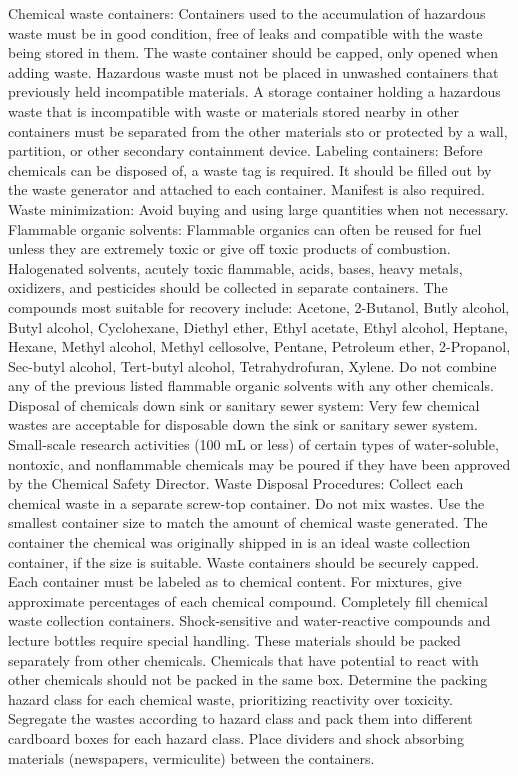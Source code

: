 \documentclass[12pt]{../SOP2}
\begin{document}
Chemical waste containers:
Containers used to the accumulation of hazardous waste must be in good condition, free of leaks and compatible with the waste being stored in them. The waste container should be capped, only opened when adding waste. Hazardous waste must not be placed in unwashed containers that previously held incompatible materials.  A storage container holding a hazardous waste that is incompatible with waste or materials stored nearby in other containers must be separated from the other materials  sto or protected by a wall, partition, or other secondary containment device. 
Labeling containers:
Before chemicals can be disposed of, a waste tag is required. It should be filled out by the waste generator and attached to each container. Manifest is also required. 
Waste minimization: 
Avoid buying and using large quantities when not necessary. 
Flammable organic solvents:
Flammable organics can often be reused for fuel unless they are extremely toxic or give off toxic products of combustion. Halogenated solvents, acutely toxic flammable, acids, bases, heavy metals, oxidizers, and pesticides should be collected in separate containers. The compounds most suitable for recovery include: Acetone, 2-Butanol, Butly alcohol, Butyl alcohol, Cyclohexane, Diethyl ether, Ethyl acetate, Ethyl alcohol, Heptane, Hexane, Methyl alcohol, Methyl cellosolve, Pentane, Petroleum ether, 2-Propanol, Sec-butyl alcohol, Tert-butyl alcohol, Tetrahydrofuran, Xylene. Do not combine any of the previous listed flammable organic solvents with any other chemicals. 
Disposal of chemicals down sink or sanitary sewer system:
Very few chemical wastes are acceptable for disposable down the sink or sanitary sewer system. Small-scale research activities (100 mL or less) of certain types of water-soluble, nontoxic, and nonflammable chemicals may be poured if they have been approved by the Chemical Safety Director. 
Waste Disposal Procedures:
Collect each chemical waste in a separate screw-top container. Do not mix wastes. Use the smallest container size to match the amount of chemical waste generated. The container the chemical was originally shipped in is an ideal waste collection container, if the size is suitable. Waste containers should be securely capped. Each container must be labeled as to chemical content. For mixtures, give approximate percentages of each chemical compound. Completely fill chemical waste collection containers. Shock-sensitive and water-reactive compounds and lecture bottles require special handling. These materials should be packed separately from other chemicals. Chemicals that have potential to react with other chemicals should not be packed in the same box. Determine the packing hazard class for each chemical waste, prioritizing reactivity over toxicity. Segregate the wastes according to hazard class and pack them into different cardboard boxes for each hazard class. Place dividers and shock absorbing materials (newspapers, vermiculite) between the containers. 
\end{document}
